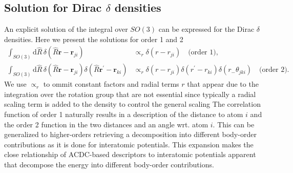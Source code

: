 \subsection{Solution for Dirac $\delta$ densities}

An explicit solution of the integral over $SO(3)$ can be expressed for the Dirac $\delta$ densities.
Here we present the solutions for order 1 and 2 
\begin{subequations}
\label{eq:dirac_delta_haar_integral}
\begin{align}
    \label{eq:dirac_delta_haar_integral_2body}
    \int_{SO(3)} \mathrm{d}\hat{R}\, \delta(\hat{R}\mathbf{r}-\mathbf{r}_{ji}) &\propto_r \delta(r-r_{ji})\quad\textrm{(order 1)},  \\%
    \label{eq:dirac_delta_haar_integral_3body}
    \int_{SO(3)} \mathrm{d}\hat{R}\, \delta(\hat{R}\mathbf{r}-\mathbf{r}_{ji}) \delta(\hat{R}\mathbf{r}^\prime-\mathbf{r}_{ki}) &\propto_r \delta(r-r_{ji})\delta(r^\prime-r_{ki})\delta(r_-\theta_{jki})\quad\textrm{(order 2)}. %
\end{align}
\end{subequations}
We use $\propto_r$ to ommit constant factors and radial terms $r$ that appear due to the integration over the rotation group that are not essential since typically a radial scaling term is added to the density to control the general scaling\cite{behler2011atom,huan-vonl16jcp,will+18pccp,drautz2019atomic,}
The correlation function of order 1 naturally results in a description of the distance to atom $i$ and the order 2 function in the two distances and an angle wrt. atom $i$.
This can be generalized to higher-orders retrieving a decomposition into different body-order contributions as it is done for interatomic potentials.
This expansion makes the close relationship of ACDC-based descriptors to interatomic potentials apparent that decompose the energy into different body-order contributions.

